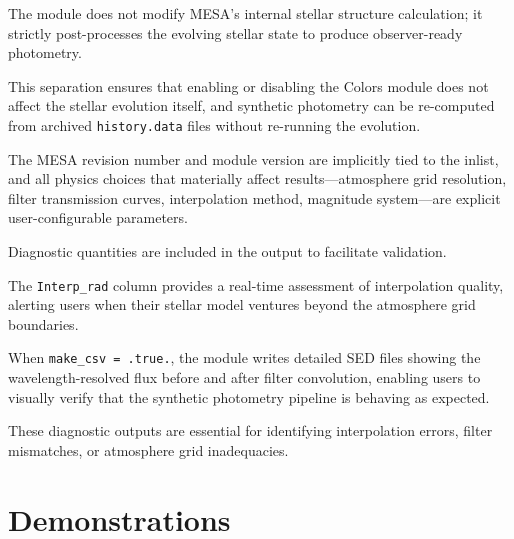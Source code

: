 \documentclass[linenumbers,apj,twocolumn, floatfix]{aastex701}
\begin{document}
The module does not modify MESA's internal stellar structure calculation; it strictly post-processes the evolving stellar state to produce observer-ready photometry. 

This separation ensures that enabling or disabling the Colors module does not affect the stellar evolution itself, and synthetic photometry can be re-computed from archived \texttt{history.data} files without re-running the evolution. 

The MESA revision number and module version are implicitly tied to the inlist, and all physics choices that materially affect results—atmosphere grid resolution, filter transmission curves, interpolation method, magnitude system—are explicit user-configurable parameters.

Diagnostic quantities are included in the output to facilitate validation. 

The \texttt{Interp\_rad} column provides a real-time assessment of interpolation quality, alerting users when their stellar model ventures beyond the atmosphere grid boundaries. 

When \texttt{make\_csv = .true.}, the module writes detailed SED files showing the wavelength-resolved flux before and after filter convolution, enabling users to visually verify that the synthetic photometry pipeline is behaving as expected. 

These diagnostic outputs are essential for identifying interpolation errors, filter mismatches, or atmosphere grid inadequacies.


\section{Demonstrations}
\label{sec:demonstrations}
\end{document}
